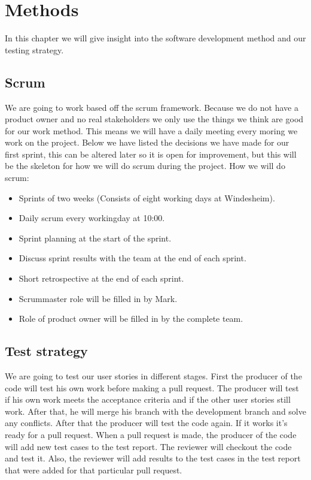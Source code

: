 \section{Methods}
In this chapter we will give insight into the software development method and our testing strategy. 

\subsection{Scrum}
We are going to work based off the scrum framework. Because we do not have a product owner and no real stakeholders we only use the things we think are good for our work method. This means we will have a daily meeting every moring we work on the project. Below we have listed the decisions we have made for our first sprint, this can be altered later so it is open for improvement, but this will be the skeleton for how we will do scrum during the project.
How we will do scrum:
\begin{itemize}
  \item Sprints of two weeks (Consists of eight working days at Windesheim).
  \item Daily scrum every workingday at 10:00.
  \item Sprint planning at the start of the sprint.
  \item Discuss sprint results with the team at the end of each sprint.
  \item Short retrospective at the end of each sprint.
  \item Scrummaster role will be filled in by Mark.
  \item Role of product owner will be filled in by the complete team.
\end{itemize}

\subsection{Test strategy}
We are going to test our user stories in different stages. First the producer of the code will test his own work before making a pull request. The producer will test if his own work meets the acceptance criteria and if the other user stories still work. After that, he will merge his branch with the development branch and solve any conflicts. After that the producer will test the code again. If it works it's ready for a pull request. When a pull request is made, the producer of the code will add new test cases to the test report. The reviewer will checkout the code and test it. Also, the reviewer will add results to the test cases in the test report that were added for that particular pull request.

